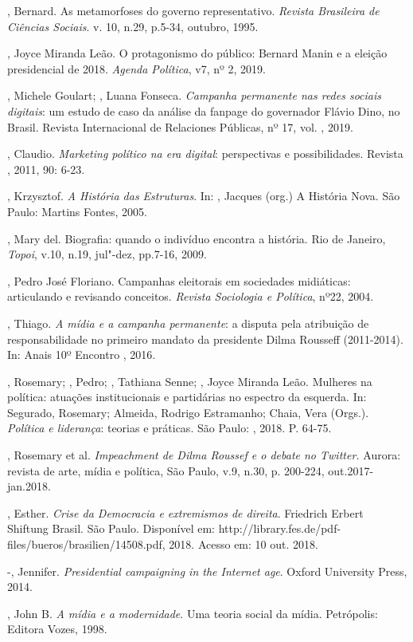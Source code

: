 \begin{Parskip}
, Bernard. As metamorfoses do governo representativo.
\emph{Revista Brasileira de Ciências Sociais}. v. 10, n.29, p.5-34,
outubro, 1995.

, Joyce Miranda Leão. O protagonismo do público: Bernard Manin e
a eleição presidencial de 2018. \emph{Agenda Política}, v7, nº 2,
2019.

, Michele Goulart; , Luana Fonseca. \emph{Campanha
permanente nas redes sociais digitais}: um estudo de caso da análise da
fanpage do governador Flávio Dino, no Brasil. Revista Internacional de
Relaciones Públicas, nº 17, vol. , 2019.

, Claudio. \emph{Marketing político na era digital}:
perspectivas e possibilidades. Revista , 2011, 90: 6-23.

, Krzysztof. \emph{A História das Estruturas}. In:  ,
Jacques (org.) A História Nova. São Paulo: Martins Fontes, 2005.

, Mary del. Biografia: quando o indivíduo encontra a história. Rio
de Janeiro, \emph{Topoi}, v.10, n.19, jul"-dez, pp.7-16, 2009.

, Pedro José Floriano. Campanhas eleitorais em sociedades
midiáticas: articulando e revisando conceitos. \emph{Revista
Sociologia e Política}, nº22, 2004.

, Thiago. \emph{A mídia e a campanha permanente}: a disputa
pela atribuição de responsabilidade no primeiro mandato da presidente
Dilma Rousseff (2011-2014). In: Anais 10º Encontro , 2016.

, Rosemary; , Pedro; , Tathiana Senne; ,
Joyce Miranda Leão. Mulheres na política: atuações institucionais e
partidárias no espectro da esquerda. In: Segurado, Rosemary; Almeida,
Rodrigo Estramanho; Chaia, Vera (Orgs.). \emph{Política e liderança}:
teorias e práticas. São Paulo: , 2018. P. 64-75.

, Rosemary et al. \emph{Impeachment de Dilma Roussef e o
debate no Twitter.} Aurora: revista de arte, mídia e política, São
Paulo, v.9, n.30, p. 200-224, out.2017-jan.2018.

, Esther. \emph{Crise da Democracia e extremismos de direita}.
Friedrich Erbert Shiftung Brasil. São Paulo. Disponível em:
http://library.fes.de/pdf-files/bueros/brasilien/14508.pdf, 2018. Acesso
em: 10 out. 2018.

-, Jennifer. \emph{Presidential campaigning in the
Internet age}. Oxford University Press, 2014.

, John B. \emph{A mídia e a modernidade}. Uma teoria social da
mídia. Petrópolis: Editora Vozes, 1998.
\end{Parskip}

